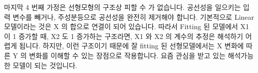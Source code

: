 \documentclass[letterpaper,10pt,english]{jupyterBook}
\begin{document}
\sphinxAtStartPar
마지막 4 번째 가정은 선형모형의 구조상 피할 수 가 없습니다. 공선성을 일으키는 입력 변수를 빼거나, 주성분등으로 공선성을 완전히 제거해야 합니다. 기본적으로 Linear 모델이라는 것은 X 의 합으로 연결이 되어 있습니다. 따라서 Fitting 된 모델에서 X1 이 1 증가할 때,  X2 도 1 증가하는 구조라면, X1 와 X2 의 계수의 추정은 해석하기 어렵게 됩니다. 하지만, 이런 구조이기 때문에 잘 fitting 된 선형모델에서는 X 변화에 따른 Y 의 변화를 이해할 수 있는 장점으로 작용합니다. 요즘 관심을 받고 있는 해석가능한 모델이 되는 것입니다.







\renewcommand{\indexname}{Index}
\printindex
\end{document}
